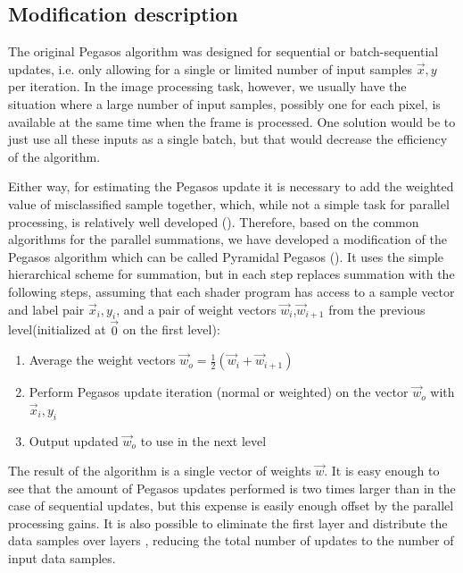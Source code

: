 \subsection{Modification description}
The original Pegasos algorithm was designed for sequential or batch-sequential updates, i.e. only allowing for a single or limited number of input samples $\vec{x},y$ per iteration. In the image processing task, however, we usually have the situation where a large number of input samples, possibly one for each pixel, is available at the same time when the frame is processed. One solution would be to just use all these inputs as a single batch, but that would decrease the efficiency of the algorithm.

Either way, for estimating the Pegasos update it is necessary to add the weighted value of misclassified sample together, which, while not a simple task for parallel processing, is relatively well developed (\cite{fung}). Therefore, based on the common algorithms for the parallel summations, we have developed a modification of the Pegasos algorithm which can be called Pyramidal Pegasos (). It uses the simple hierarchical scheme for summation, but in each step replaces summation with the following steps, assuming that each shader program has access to a sample vector and label pair $\vec{x}_i, y_i$, and a pair of weight vectors $\vec{w}_{i}$,$\vec{w}_{i+1}$ from the previous level(initialized at $\vec{0}$ on the first level):
\begin{enumerate}
\item Average the weight vectors $\vec{w}_o=\frac{1}{2}\left(\vec{w}_{i}+\vec{w}_{i+1}\right)$
\item Perform Pegasos update iteration (normal or weighted) on the vector $\vec{w}_o$ with $\vec{x}_i, y_i$
\item Output updated $\vec{w}_o$ to use in the next level 
\end{enumerate}
The result of the algorithm is a single vector of weights $\vec{w}$. It is easy enough to see that the amount of Pegasos updates performed is two times larger than in the case of sequential updates, but this expense is easily enough offset by the parallel processing gains. It is also possible to eliminate the first layer and distribute the data samples over layers , reducing the total number of updates to the number of input data samples.
